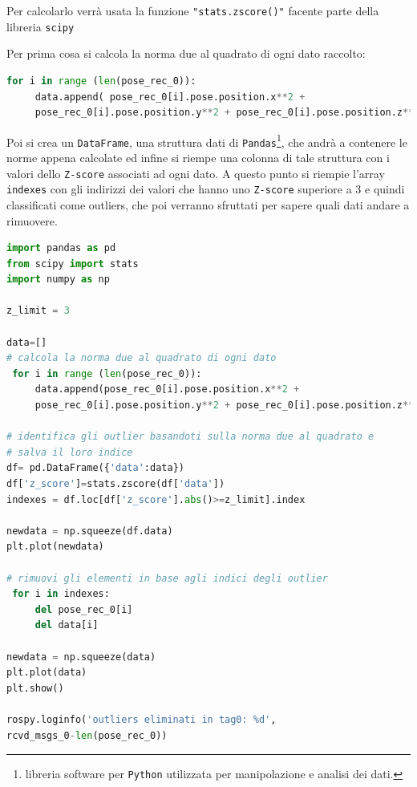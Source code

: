 Per calcolarlo verrà usata la funzione \texttt{"stats.zscore()"} facente parte della libreria \texttt{scipy} 

Per prima cosa si calcola la norma due al quadrato di ogni dato raccolto:

\begin{lstlisting}[language=Python]
 for i in range (len(pose_rec_0)):
     data.append( pose_rec_0[i].pose.position.x**2 +
     pose_rec_0[i].pose.position.y**2 + pose_rec_0[i].pose.position.z**2 )
\end{lstlisting}

\bigskip
\bigskip

Poi si crea un \texttt{DataFrame}, una struttura dati di \texttt{Pandas}\footnote{libreria software per \texttt{Python} utilizzata per manipolazione e analisi dei dati.}, che andrà a contenere le norme appena calcolate ed infine si riempe una colonna di tale struttura con i valori dello \texttt{Z-score} associati ad ogni dato. 
A questo punto si riempie l'array \texttt{indexes} con gli indirizzi dei valori che hanno uno \texttt{Z-score} superiore a 3 e quindi classificati come outliers, che poi verranno sfruttati per sapere quali dati andare a rimuovere.
\begin{lstlisting}[language=Python]
import pandas as pd
from scipy import stats
import numpy as np

z_limit = 3

data=[]
# calcola la norma due al quadrato di ogni dato
 for i in range (len(pose_rec_0)):
     data.append(pose_rec_0[i].pose.position.x**2 +
     pose_rec_0[i].pose.position.y**2 + pose_rec_0[i].pose.position.z**2)

# identifica gli outlier basandoti sulla norma due al quadrato e
# salva il loro indice
df= pd.DataFrame({'data':data})
df['z_score']=stats.zscore(df['data'])
indexes = df.loc[df['z_score'].abs()>=z_limit].index 
	
newdata = np.squeeze(df.data)
plt.plot(newdata)

# rimuovi gli elementi in base agli indici degli outlier
 for i in indexes:
     del pose_rec_0[i]
     del data[i]

newdata = np.squeeze(data)
plt.plot(data)
plt.show()
	
rospy.loginfo('outliers eliminati in tag0: %d',
rcvd_msgs_0-len(pose_rec_0))
\end{lstlisting}

\bigskip
\bigskip

